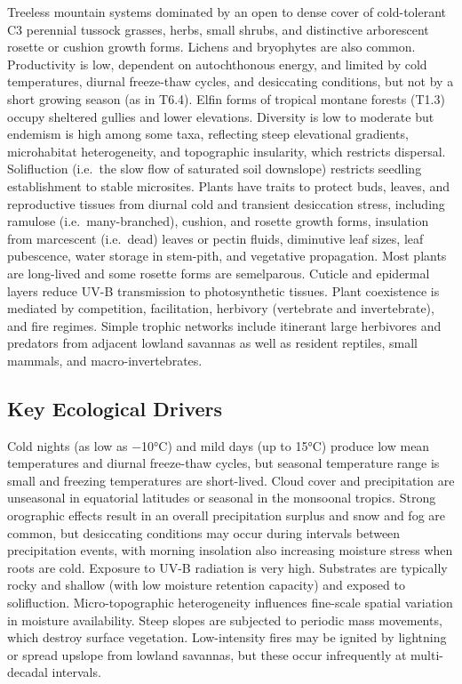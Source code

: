 \documentclass[
  letterpaper,
  DIV=11,
  numbers=noendperiod]{scrartcl}
\begin{document}
Treeless mountain systems dominated by an open to dense cover of
cold-tolerant C3 perennial tussock grasses, herbs, small shrubs, and
distinctive arborescent rosette or cushion growth forms. Lichens and
bryophytes are also common. Productivity is low, dependent on
autochthonous energy, and limited by cold temperatures, diurnal
freeze-thaw cycles, and desiccating conditions, but not by a short
growing season (as in T6.4). Elfin forms of tropical montane forests
(T1.3) occupy sheltered gullies and lower elevations. Diversity is low
to moderate but endemism is high among some taxa, reflecting steep
elevational gradients, microhabitat heterogeneity, and topographic
insularity, which restricts dispersal. Solifluction (i.e.~the slow flow
of saturated soil downslope) restricts seedling establishment to stable
microsites. Plants have traits to protect buds, leaves, and reproductive
tissues from diurnal cold and transient desiccation stress, including
ramulose (i.e.~many-branched), cushion, and rosette growth forms,
insulation from marcescent (i.e.~dead) leaves or pectin fluids,
diminutive leaf sizes, leaf pubescence, water storage in stem-pith, and
vegetative propagation. Most plants are long-lived and some rosette
forms are semelparous. Cuticle and epidermal layers reduce UV-B
transmission to photosynthetic tissues. Plant coexistence is mediated by
competition, facilitation, herbivory (vertebrate and invertebrate), and
fire regimes. Simple trophic networks include itinerant large herbivores
and predators from adjacent lowland savannas as well as resident
reptiles, small mammals, and macro-invertebrates.

\subsection{Key Ecological Drivers}\label{key-ecological-drivers-97}

Cold nights (as low as −10°C) and mild days (up to 15°C) produce low
mean temperatures and diurnal freeze-thaw cycles, but seasonal
temperature range is small and freezing temperatures are short-lived.
Cloud cover and precipitation are unseasonal in equatorial latitudes or
seasonal in the monsoonal tropics. Strong orographic effects result in
an overall precipitation surplus and snow and fog are common, but
desiccating conditions may occur during intervals between precipitation
events, with morning insolation also increasing moisture stress when
roots are cold. Exposure to UV-B radiation is very high. Substrates are
typically rocky and shallow (with low moisture retention capacity) and
exposed to solifluction. Micro-topographic heterogeneity influences
fine-scale spatial variation in moisture availability. Steep slopes are
subjected to periodic mass movements, which destroy surface vegetation.
Low-intensity fires may be ignited by lightning or spread upslope from
lowland savannas, but these occur infrequently at multi-decadal
intervals.
\end{document}
